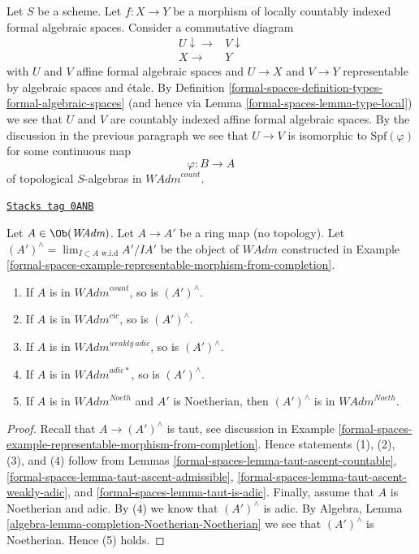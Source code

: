 \medskip\noindent
Let $S$ be a scheme. Let $f : X \to Y$ be a morphism of
locally countably indexed formal algebraic spaces. Consider a
commutative diagram
$$
\begin{array}{cc}U \downarrow\longrightarrow & V \downarrow \\ X \longrightarrow & Y\end{array}
$$
with $U$ and $V$ affine formal algebraic spaces and $U \to X$ and $V \to Y$
representable by algebraic spaces and \'etale. By
Definition \ref{formal-spaces-definition-types-formal-algebraic-spaces} (and hence via
Lemma \ref{formal-spaces-lemma-type-local}) we see that $U$ and $V$ are countably indexed
affine formal algebraic spaces. By the discussion in the previous
paragraph we see that $U \to V$ is isomorphic to $\text{Spf}(\varphi)$
for some continuous map
$$
\varphi : B \longrightarrow A
$$
of topological $S$-algebras in $\textit{WAdm}^{count}$.

\begin{lemma}
\label{formal-spaces-lemma-completion-in-sub}
\href{https://stacks.math.columbia.edu/tag/0ANB}{\texttt{Stacks tag 0ANB}}

Let $A \in \Ob(\textit{WAdm})$. Let $A \to A'$ be a ring
map (no topology). Let $(A')^\wedge = \lim_{I \subset A\text{ w.i.d}} A'/IA'$
be the object of $\textit{WAdm}$ constructed in
Example \ref{formal-spaces-example-representable-morphism-from-completion}.
\begin{enumerate}
\item If $A$ is in $\textit{WAdm}^{count}$, so is $(A')^\wedge$.
\item If $A$ is in $\textit{WAdm}^{cic}$, so is $(A')^\wedge$.
\item If $A$ is in $\textit{WAdm}^{weakly\ adic}$, so is $(A')^\wedge$.
\item If $A$ is in $\textit{WAdm}^{adic*}$, so is $(A')^\wedge$.
\item If $A$ is in $\textit{WAdm}^{Noeth}$ and $A'$ is Noetherian, then
$(A')^\wedge$ is in $\textit{WAdm}^{Noeth}$.
\end{enumerate}
\end{lemma}

\begin{proof}
Recall that $A \to (A')^\wedge$ is taut, see discussion in
Example \ref{formal-spaces-example-representable-morphism-from-completion}.
Hence statements (1), (2), (3), and (4) follow from Lemmas
\ref{formal-spaces-lemma-taut-ascent-countable},
\ref{formal-spaces-lemma-taut-ascent-admissible},
\ref{formal-spaces-lemma-taut-ascent-weakly-adic}, and
\ref{formal-spaces-lemma-taut-is-adic}.
Finally, assume that $A$ is Noetherian and adic.
By (4) we know that $(A')^\wedge$ is adic.
By Algebra, Lemma \ref{algebra-lemma-completion-Noetherian-Noetherian}
we see that $(A')^\wedge$ is Noetherian. Hence (5) holds.
\end{proof}

